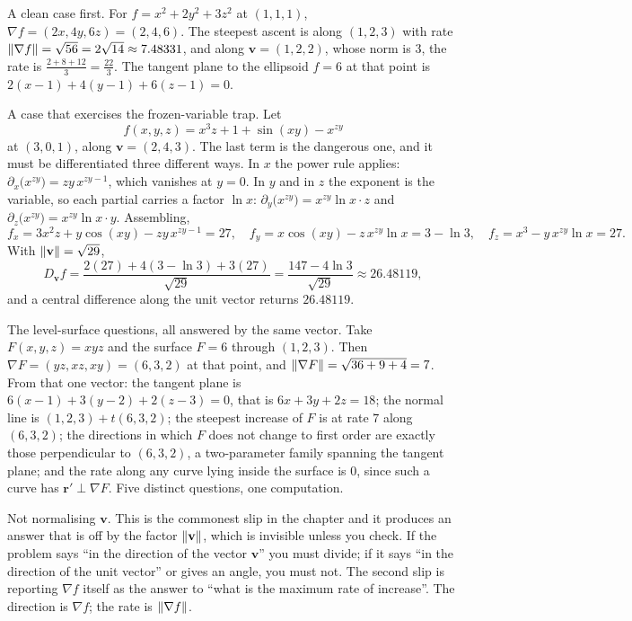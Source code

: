 \begin{worked}
A clean case first. For $f=x^{2}+2y^{2}+3z^{2}$ at $(1,1,1)$, $\nabla f=(2x,4y,6z)=(2,4,6)$. The steepest ascent is along $(1,2,3)$ with rate $\left\lVert \nabla f\right\rVert=\sqrt{56}=2\sqrt{14}\approx7.48331$, and along $\mathbf v=(1,2,2)$, whose norm is $3$, the rate is $\tfrac{2+8+12}{3}=\tfrac{22}{3}$. The tangent plane to the ellipsoid $f=6$ at that point is $2(x-1)+4(y-1)+6(z-1)=0$.

A case that exercises the frozen-variable trap. Let
\[
f(x,y,z)=x^{3}z+1+\sin(xy)-x^{zy}
\]
at $(3,0,1)$, along $\mathbf v=(2,4,3)$. The last term is the dangerous one, and it must be differentiated three different ways. In $x$ the power rule applies: $\partial_{x}\bigl(x^{zy}\bigr)=zy\,x^{zy-1}$, which vanishes at $y=0$. In $y$ and in $z$ the exponent is the variable, so each partial carries a factor $\ln x$: $\partial_{y}\bigl(x^{zy}\bigr)=x^{zy}\ln x\cdot z$ and $\partial_{z}\bigl(x^{zy}\bigr)=x^{zy}\ln x\cdot y$. Assembling,
\[
f_{x}=3x^{2}z+y\cos(xy)-zy\,x^{zy-1}=27,\quad
f_{y}=x\cos(xy)-z\,x^{zy}\ln x=3-\ln3,\quad
f_{z}=x^{3}-y\,x^{zy}\ln x=27 .
\]
With $\left\lVert \mathbf v\right\rVert=\sqrt{29}$,
\[
D_{\mathbf v}f=\frac{2(27)+4(3-\ln3)+3(27)}{\sqrt{29}}=\frac{147-4\ln3}{\sqrt{29}}\approx 26.48119 ,
\]
and a central difference along the unit vector returns $26.48119$.

The level-surface questions, all answered by the same vector. Take $F(x,y,z)=xyz$ and the surface $F=6$ through $(1,2,3)$. Then $\nabla F=(yz,xz,xy)=(6,3,2)$ at that point, and $\left\lVert \nabla F\right\rVert=\sqrt{36+9+4}=7$. From that one vector: the tangent plane is $6(x-1)+3(y-2)+2(z-3)=0$, that is $6x+3y+2z=18$; the normal line is $(1,2,3)+t(6,3,2)$; the steepest increase of $F$ is at rate $7$ along $(6,3,2)$; the directions in which $F$ does not change to first order are exactly those perpendicular to $(6,3,2)$, a two-parameter family spanning the tangent plane; and the rate along any curve lying inside the surface is $0$, since such a curve has $\mathbf r'\perp\nabla F$. Five distinct questions, one computation.
\end{worked}

\begin{trap}
Not normalising $\mathbf v$. This is the commonest slip in the chapter and it produces an answer that is off by the factor $\left\lVert \mathbf v\right\rVert$, which is invisible unless you check. If the problem says ``in the direction of the vector $\mathbf v$'' you must divide; if it says ``in the direction of the unit vector'' or gives an angle, you must not. The second slip is reporting $\nabla f$ itself as the answer to ``what is the maximum rate of increase''. The direction is $\nabla f$; the rate is $\left\lVert \nabla f\right\rVert$.
\end{trap}

